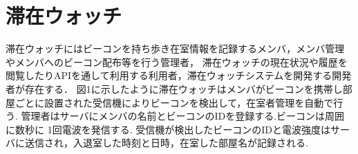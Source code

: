 
\section{滞在ウォッチ}
\label{sec:const}
滞在ウォッチにはビーコンを持ち歩き在室情報を記録するメンバ，メンバ管理やメンバへのビーコン配布等を行う管理者，
滞在ウォッチの現在状況や履歴を閲覧したりAPIを通して利用する利用者，滞在ウォッチシステムを開発する開発者が存在する．
図1に示したように滞在ウォッチはメンバがビーコンを携帯し部屋ごとに設置された受信機によりビーコンを検出して，在室者管理を自動で行う.
管理者はサーバにメンバの名前とビーコンのIDを登録する.ビーコンは周囲に数秒に 1回電波を発信する.
受信機が検出したビーコンのIDと電波強度はサーバに送信され，入退室した時刻と日時，在室した部屋名が記録される.



